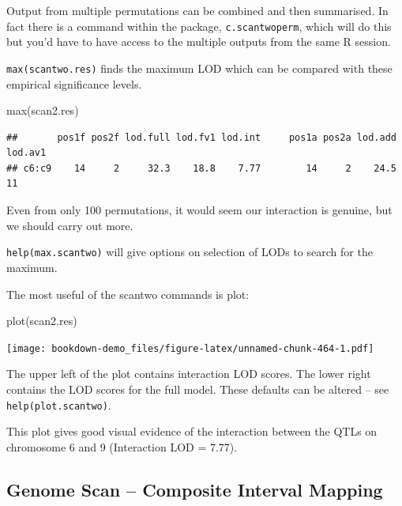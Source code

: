 \documentclass[
]{book}
\newenvironment{Shaded}{\begin{snugshade}}{\end{snugshade}}
\newcommand{\FunctionTok}[1]{\textcolor[rgb]{0.00,0.00,0.00}{#1}}
\newcommand{\NormalTok}[1]{#1}
\begin{document}
Output from multiple permutations can be combined and then summarised. In fact there is a command within the package, \texttt{c.scantwoperm}, which will do this but you'd have to have access to the multiple outputs from the same R session.

\texttt{max(scantwo.res)} finds the maximum LOD which can be compared with these empirical significance levels.

\begin{Shaded}
\begin{Highlighting}[]
\FunctionTok{max}\NormalTok{(scan2.res)}
\end{Highlighting}
\end{Shaded}

\begin{verbatim}
##       pos1f pos2f lod.full lod.fv1 lod.int     pos1a pos2a lod.add lod.av1
## c6:c9    14     2     32.3    18.8    7.77        14     2    24.5      11
\end{verbatim}

Even from only 100 permutations, it would seem our interaction is genuine, but we should carry out more.

\texttt{help(max.scantwo)} will give options on selection of LODs to search for the maximum.

The most useful of the scantwo commands is plot:

\begin{Shaded}
\begin{Highlighting}[]
\FunctionTok{plot}\NormalTok{(scan2.res)}
\end{Highlighting}
\end{Shaded}

\texttt{[image: bookdown-demo\_files/figure-latex/unnamed-chunk-464-1.pdf]}

The upper left of the plot contains interaction LOD scores. The lower right contains the LOD scores for the full model. These defaults can be altered -- see \texttt{help(plot.scantwo)}.

This plot gives good visual evidence of the interaction between the QTLs on chromosome 6 and 9 (Interaction LOD = 7.77).

\hypertarget{genome-scan-composite-interval-mapping}{%
\subsection{Genome Scan -- Composite Interval Mapping}\label{genome-scan-composite-interval-mapping}}
\end{document}
